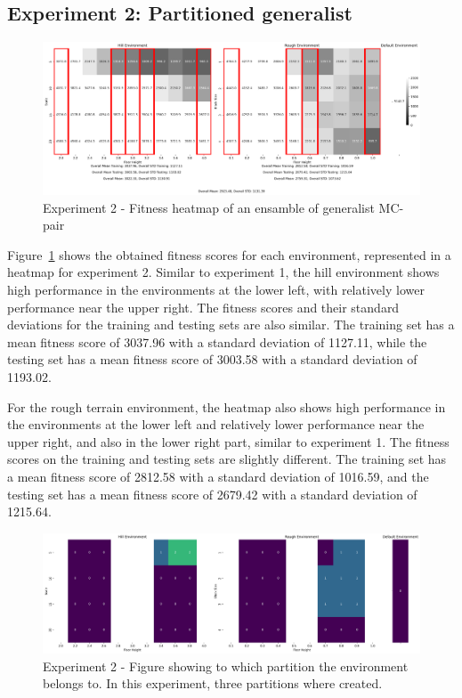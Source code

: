         \subsection{Experiment 2: Partitioned generalist}
            \begin{figure}[ht]
                \centering
                \includegraphics[width=\linewidth]{./resources/partition_5_2906_3/fitness_heatmap.png}
                \caption{Experiment 2 - Fitness heatmap of an ensamble of generalist MC-pair}
                \label{fig:fit_heat_partitioned}
            \end{figure}

            Figure~\ref{fig:fit_heat_partitioned} shows the obtained fitness scores for each environment, represented in a heatmap for experiment 2. Similar to experiment 1, the hill environment shows high performance in the environments at the lower left, with relatively lower performance near the upper right. The fitness scores and their standard deviations for the training and testing sets are also similar. The training set has a mean fitness score of 3037.96 with a standard deviation of 1127.11, while the testing set has a mean fitness score of 3003.58 with a standard deviation of 1193.02. 

            For the rough terrain environment, the heatmap also shows high performance in the environments at the lower left and relatively lower performance near the upper right, and also in the lower right part, similar to experiment 1. The fitness scores on the training and testing sets are slightly different. The training set has a mean fitness score of 2812.58 with a standard deviation of 1016.59, and the testing set has a mean fitness score of 2679.42 with a standard deviation of 1215.64. 
            
            \begin{figure}[ht]
                \centering
                \includegraphics[width=\linewidth]{./resources/partition_5_2906_3/generalist_heatmap_partition.png}
                \caption{Experiment 2 - Figure showing to which partition the environment belongs to. In this experiment, three partitions where created.}
                \label{fig:heat_partition_number}
            \end{figure}

